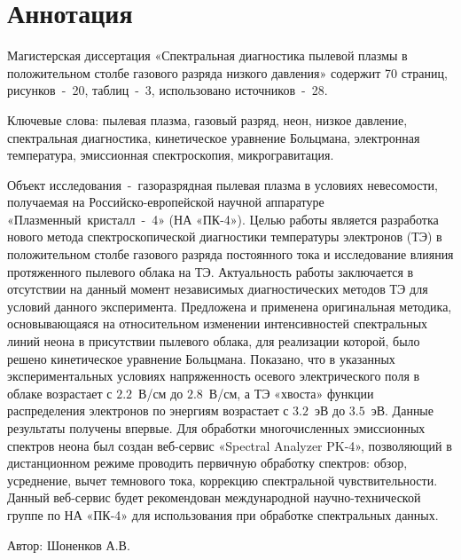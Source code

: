 \chapter*{Аннотация}

Магистерская диссертация «Спектральная диагностика пылевой плазмы в положительном столбе газового разряда низкого давления»
содержит 70 страниц, рисунков~-~20, таблиц~-~3, использовано источников~-~28.

Ключевые слова: пылевая плазма, газовый разряд, неон, низкое давление, спектральная диагностика,
кинетическое уравнение Больцмана, электронная температура, эмиссионная спектроскопия, микрогравитация.

Объект исследования~-~газоразрядная пылевая плазма в условиях невесомости,
получаемая на Российско-европейской научной аппаратуре «Плазменный~кристалл~-~4» (НА «ПК-4»).
Целью работы является разработка нового метода спектроскопической диагностики температуры электронов (ТЭ) в
положительном столбе газового разряда постоянного тока и исследование влияния
протяженного пылевого облака на ТЭ. Актуальность работы
заключается в отсутствии на данный момент независимых диагностических методов
ТЭ для условий данного эксперимента.
Предложена и применена оригинальная методика, основывающаяся на
относительном изменении интенсивностей спектральных линий неона в
присутствии пылевого облака, для реализации которой, было решено
кинетическое уравнение Больцмана. Показано, что в указанных
экспериментальных условиях напряженность осевого электрического поля в облаке
возрастает с $2.2$~В/см до $2.8$~В/см, а ТЭ «хвоста» функции распределения
электронов по энергиям возрастает с $3.2$~эВ до $3.5$~эВ. Данные результаты
получены впервые. Для обработки многочисленных эмиссионных спектров неона
был создан веб-сервис «Spectral Analyzer PK-4», позволяющий в дистанционном
режиме проводить первичную обработку спектров: обзор, усреднение, вычет
темнового тока, коррекцию спектральной чувствительности. Данный
веб-сервис будет рекомендован международной научно-технической группе по НА
«ПК-4» для использования при обработке спектральных данных.

\vfill
\vfill
\begin{minipage}{.49\textwidth}\end{minipage}
\hfill
\begin{minipage}{.49\textwidth}
    Автор: \uline{\hfill} Шоненков А.В.
\end{minipage}
\vfill
